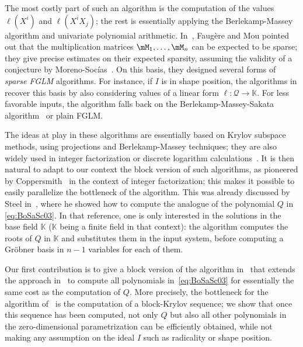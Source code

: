 \documentclass[12pt]{article}
\newcommand{\lf}{X}
\newcommand{\residueI}{\mathscr{Q}}
\newcommand{\sqfree}{Q}
\def\K{\mathbb{K}}
\def\K {\ensuremath{\mathbb{K}}}
\begin{document}
The most costly part of such an algorithm is the computation of the
values $\ell(\lf^i)$ and $\ell(\lf^i X_j)$; the rest is essentially 
applying the Berlekamp-Massey algorithm and univariate
polynomial arithmetic. In~\cite{FaMo17}, Faug{\`e}re and Mou pointed
out that the multiplication matrices $\mM_1,\dots,\mM_n$ can be
expected to be sparse; they give precise estimates on their expected
sparsity, assuming the validity of a conjecture by
Moreno-Soc\'ias~\cite{MorenoSocias91}. 
On this basis, they designed several forms of {\em sparse FGLM}
algorithms. For instance, if $I$ is in shape position, the algorithms
in \cite{FaMo17} recover this basis
by also considering values of
a linear form $\ell:\residueI \to \K$. For less favorable inputs, the algorithm
falls back on the Berlekamp-Massey-Sakata algorithm~\cite{Sakata90}
or plain FGLM.

The ideas at play in these algorithms are essentially based on Krylov subspace
methods, using projections and Berlekamp-Massey techniques; they are
also widely used in integer factorization or discrete logarithm
calculations~\cite{xxx,yyy}. It is then natural to adapt to our
context the block version of such algorithms, as pioneered by
Coppersmith~\cite{Coppersmith94} in the context of integer
factorization; this makes it possible to easily parallelize the
bottleneck of the algorithm. This was already discussed by Steel
in~\cite{Steel15}, where he showed how to compute the analogue of
the polynomial $\sqfree$ in \cref{eq:BoSaSc03}. In that reference, one is
only interested in the solutions in the base field $\K$ ($\K$ being a
finite field in that context): the algorithm computes the roots of $\sqfree$
in $\K$ and substitutes them in the input system, before computing a
Gr\"obner basis in $n-1$ variables for each of them.

Our first contribution is to give a block version of the algorithm
in~\cite{BoSaSc03} that extends the approach in~\cite{Steel15} to
compute all polynomials in~\cref{eq:BoSaSc03} for essentially the
same cost as the computation of $\sqfree$. More precisely, the bottleneck
for the algorithm of~\cite{Steel15} is the computation of a
block-Krylov sequence; we show that once this sequence has been
computed, not only $\sqfree$ but also all other polynomials in the
zero-dimensional parametrization can be efficiently obtained, while
not making any assumption on the ideal $I$ such as radicality or shape
position.
\end{document}
